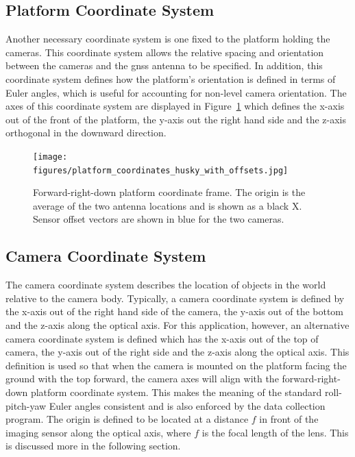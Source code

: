 \subsection{Platform Coordinate System}
\label{platform_coordinate_system}

Another necessary coordinate system is one fixed to the platform holding the cameras.  This coordinate system allows the relative spacing and orientation between the cameras and the \ac{gnss} antenna to be specified.  In addition, this coordinate system defines how the platform's orientation is defined in terms of Euler angles, which is useful for accounting for non-level camera orientation.  The axes of this coordinate system are displayed in Figure~\ref{platform_frame} which defines the x-axis out of the front of the platform, the y-axis out the right hand side and the z-axis orthogonal in the downward direction.  

\begin{figure}
	\centering
    \texttt{[image: figures/platform\_coordinates\_husky\_with\_offsets.jpg]}
    \caption[Platform coordinate frame]{Forward-right-down platform coordinate frame. The origin is the average of the two antenna locations and is shown as a black X.  Sensor offset vectors are shown in blue for the two cameras.}
    \label{platform_frame}
\end{figure}

\subsection{Camera Coordinate System}

The camera coordinate system describes the location of objects in the world relative to the camera body.  Typically, a camera coordinate system is defined by the x-axis out of the right hand side of the camera, the y-axis out of the bottom and the z-axis along the optical axis.  For this application, however, an alternative camera coordinate system is defined which has the x-axis out of the top of camera, the y-axis out of the right side and the z-axis along the optical axis.  This definition is used so that when the camera is mounted on the platform facing the ground with the top forward, the camera axes will align with the forward-right-down platform coordinate system.  This makes the meaning of the standard roll-pitch-yaw Euler angles consistent and is also enforced by the data collection program.  The origin is defined to be located at a distance $f$ in front of the imaging sensor along the optical axis, where $f$ is the focal length of the lens.  This is discussed more in the following section.

